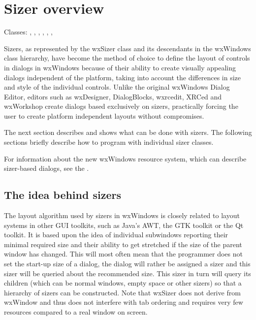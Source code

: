 \section{Sizer overview}\label{sizeroverview}

Classes: , , 
, , 
, 
,

Sizers, as represented by the wxSizer class and its descendants in
the wxWindows class hierarchy, have become the method of choice to
define the layout of controls in dialogs in wxWindows because of
their ability to create visually appealing dialogs independent of the
platform, taking into account the differences in size and style of
the individual controls. Unlike the original wxWindows Dialog Editor,
editors such as wxDesigner, DialogBlocks, wxrcedit, XRCed and wxWorkshop create dialogs based exclusively on sizers,
practically forcing the user to create platform independent layouts without compromises.

The next section describes and shows what can be done with sizers.
The following sections briefly describe how to program with individual sizer classes.

For information about the new wxWindows resource system, which can describe
sizer-based dialogs, see the .

\subsection{The idea behind sizers}\label{ideabehindsizers}

The layout algorithm used by sizers in wxWindows is closely related to layout
systems in other GUI toolkits, such as Java's AWT, the GTK toolkit or the Qt toolkit. It is
based upon the idea of individual subwindows reporting their minimal required
size and their ability to get stretched if the size of the parent window has changed.
This will most often mean that the programmer does not set the start-up size of
a dialog, the dialog will rather be assigned a sizer and this sizer
will be queried about the recommended size. This sizer in turn will query its
children (which can be normal windows, empty space or other sizers) so that
a hierarchy of sizers can be constructed. Note that wxSizer does not derive from wxWindow
and thus does not interfere with tab ordering and requires very few resources compared
to a real window on screen.

